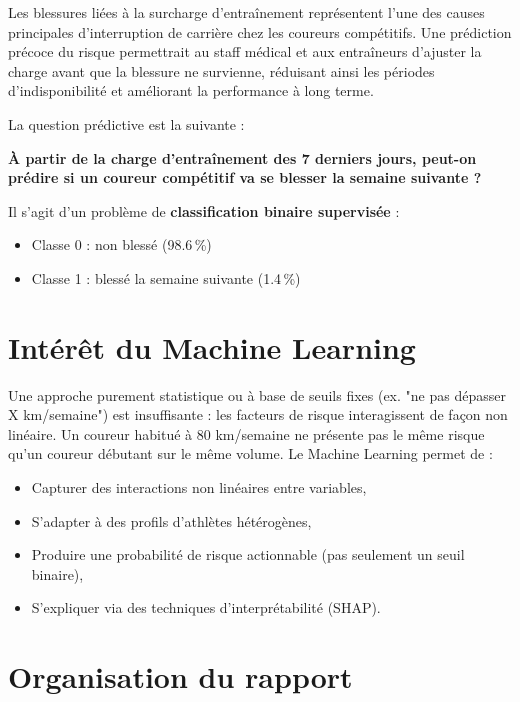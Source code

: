 \documentclass[12pt,a4paper]{report}
\begin{document}
Les blessures liées à la surcharge d'entraînement représentent l'une des causes principales
d'interruption de carrière chez les coureurs compétitifs. Une prédiction précoce du risque
permettrait au staff médical et aux entraîneurs d'ajuster la charge avant que la blessure
ne survienne, réduisant ainsi les périodes d'indisponibilité et améliorant la performance
à long terme.

La question prédictive est la suivante :

\begin{infobox}[title=Question de recherche]
\textbf{À partir de la charge d'entraînement des 7 derniers jours, peut-on prédire
si un coureur compétitif va se blesser la semaine suivante ?}
\end{infobox}

Il s'agit d'un problème de \textbf{classification binaire supervisée} :
\begin{itemize}
  \item Classe 0 : non blessé (98.6\,\%)
  \item Classe 1 : blessé la semaine suivante (1.4\,\%)
\end{itemize}

\section{Intérêt du Machine Learning}

Une approche purement statistique ou à base de seuils fixes (ex. "ne pas dépasser X km/semaine")
est insuffisante : les facteurs de risque interagissent de façon non linéaire. Un coureur
habitué à 80 km/semaine ne présente pas le même risque qu'un coureur débutant sur le même volume.
Le Machine Learning permet de :
\begin{itemize}
  \item Capturer des interactions non linéaires entre variables,
  \item S'adapter à des profils d'athlètes hétérogènes,
  \item Produire une probabilité de risque actionnable (pas seulement un seuil binaire),
  \item S'expliquer via des techniques d'interprétabilité (SHAP).
\end{itemize}

\section{Organisation du rapport}
\end{document}
